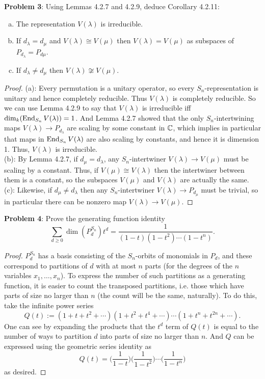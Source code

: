 \documentclass{amsart}
\begin{document}
	\newpage
	\textbf{Problem 3}: Using Lemmas 4.2.7 and 4.2.9, deduce Corollary 4.2.11:
	\begin{enumerate}[(a)]
		\item The representation $V(\lambda)$ is irreducible.
		\item If $d_{\lambda} = d_{\mu}$ and $V(\lambda) \cong V(\mu)$ then $V(\lambda) = V(\mu)$ as subspaces of $P_{d_{\lambda}}=P_{d{\mu}}$.
		\item If $d_{\lambda} \neq d_{\mu}$ then $V(\lambda)\not\cong V(\mu)$.
	\end{enumerate}
	\begin{proof}
		(a): Every permutation is a unitary operator, so every $S_n$-representation is unitary and hence completely reducible. Thus $V(\lambda)$ is completely reducible. So we can use Lemma 4.2.9 to say that $V(\lambda)$ is irreducible iff $\dim_k(\operatorname{End}_{S_n}V(\lambda)) = 1$. And Lemma 4.2.7 showed that the only $S_n$-intertwining maps $V(\lambda)\to P_{d_{\lambda}}$ are scaling by some constant in $\mathbb{C}$, which implies in particular that maps in $\operatorname{End}_{S_n}V(\lambda)$ are also scaling by constants, and hence it is dimension 1. Thus, $V(\lambda)$ is irreducible. \\
		
		(b): By Lemma 4.2.7, if $d_{\mu}=d_{\lambda}$, any $S_n$-intertwiner $V(\lambda)\to V(\mu)$ must be scaling by a constant. Thus, if $V(\mu)\cong V(\lambda)$ then the intertwiner between them is a constant, so the subspaces $V(\mu)$ and $V(\lambda)$ are actually the same.\\
		
		(c): Likewise, if $d_{\mu}\neq d_{\lambda}$ then any $S_n$-intertwiner $V(\lambda)\to P_{d_{\mu}}$ must be trivial, so in particular there can be nonzero map $V(\lambda)\to V(\mu)$.
	\end{proof}
	
	\newpage
	\textbf{Problem 4}: Prove the generating function identity
	$$
	\sum_{d\geq 0} \dim(P_d^{S_n}) t^d = \frac{1}{(1-t)(1-t^2)\cdots(1-t^n)}.
	$$
	\begin{proof}
		$P_d^{S_n}$ has a basis consisting of the $S_n$-orbits of monomials in $P_d$, and these correspond to partitions of $d$ with at most $n$ parts (for the degrees of the $n$ variables $x_1,\dots,x_n$). To express the number of such partitions as a generating function, it is easier to count the transposed partitions, i.e. those which have parts of size no larger than $n$ (the count will be the same, naturally). To do this, take the infinite power series  
		$$
		Q(t) := (1+t+t^2+\cdots)(1+t^2+t^4+\cdots)\cdots (1+t^n+t^{2n}+\cdots).
		$$
		One can see by expanding the products that the $t^d$ term of $Q(t)$ is equal to the number of ways to partition $d$ into parts of size no larger than $n$. And $Q$ can be expressed using the geometric series identity as
		$$
		Q(t) = \bigg(\frac{1}{1-t}\bigg)\bigg(\frac{1}{1-t^2}\bigg)\cdots \bigg(\frac{1}{1-t^n}\bigg)
		$$
		as desired.
	\end{proof}
	
\end{document}
